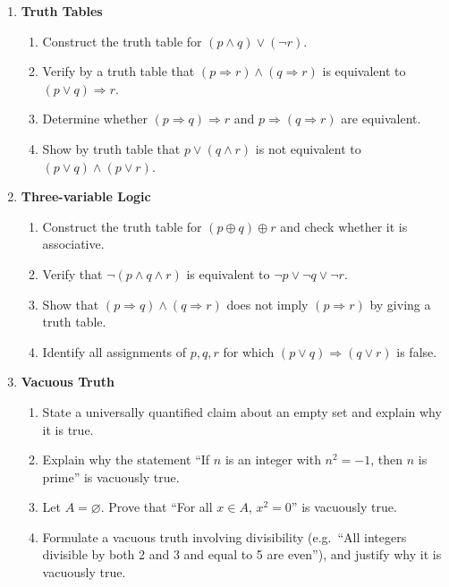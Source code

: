\begin{enumerate}

\item \textbf{Truth Tables}
  \begin{enumerate}
    \item Construct the truth table for $(p \land q) \lor (\lnot r)$.
    \item Verify by a truth table that $(p \Rightarrow r) \land (q \Rightarrow r)$
          is equivalent to $(p \lor q) \Rightarrow r$.
    \item Determine whether $(p \Rightarrow q) \Rightarrow r$ and
          $p \Rightarrow (q \Rightarrow r)$ are equivalent.
    \item Show by truth table that $p \lor (q \land r)$ is not equivalent to
          $(p \lor q) \land (p \lor r)$.
  \end{enumerate}

\item \textbf{Three-variable Logic}
  \begin{enumerate}
    \item Construct the truth table for $(p \oplus q) \oplus r$ and check whether it is associative.
    \item Verify that $\lnot(p \land q \land r)$ is equivalent to $\lnot p \lor \lnot q \lor \lnot r$.
    \item Show that $(p \Rightarrow q) \land (q \Rightarrow r)$ does not imply $(p \Rightarrow r)$ by giving a truth table.
    \item Identify all assignments of $p,q,r$ for which $(p \lor q) \Rightarrow (q \lor r)$ is false.
  \end{enumerate}

\item \textbf{Vacuous Truth}
  \begin{enumerate}
    \item State a universally quantified claim about an empty set and explain why it is true.
    \item Explain why the statement ``If $n$ is an integer with $n^2=-1$, then $n$ is prime'' is vacuously true.
    \item Let $A=\varnothing$. Prove that ``For all $x\in A$, $x^2=0$'' is vacuously true.
    \item Formulate a vacuous truth involving divisibility (e.g.\ ``All integers divisible by both 2 and 3 and equal to 5 are even''), and justify why it is vacuously true.
  \end{enumerate}


\end{enumerate}

